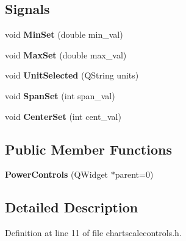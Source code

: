 \subsection*{Signals}
\begin{DoxyCompactItemize}
\item 
void {\bfseries Min\+Set} (double min\+\_\+val)\hypertarget{class_power_controls_ab9a1d9f89f194471d0e31f6dad01086a}{}\label{class_power_controls_ab9a1d9f89f194471d0e31f6dad01086a}

\item 
void {\bfseries Max\+Set} (double max\+\_\+val)\hypertarget{class_power_controls_aef88de9bf3ae6738020c9334ee79e857}{}\label{class_power_controls_aef88de9bf3ae6738020c9334ee79e857}

\item 
void {\bfseries Unit\+Selected} (Q\+String units)\hypertarget{class_power_controls_a6077789456f1780b9f86569256334a38}{}\label{class_power_controls_a6077789456f1780b9f86569256334a38}

\item 
void {\bfseries Span\+Set} (int span\+\_\+val)\hypertarget{class_power_controls_ad146203ff843dd336cca6838be0aa9b4}{}\label{class_power_controls_ad146203ff843dd336cca6838be0aa9b4}

\item 
void {\bfseries Center\+Set} (int cent\+\_\+val)\hypertarget{class_power_controls_a79b389c9c31f94eb5b0ae8fc771b1c7d}{}\label{class_power_controls_a79b389c9c31f94eb5b0ae8fc771b1c7d}

\end{DoxyCompactItemize}
\subsection*{Public Member Functions}
\begin{DoxyCompactItemize}
\item 
{\bfseries Power\+Controls} (Q\+Widget $\ast$parent=0)\hypertarget{class_power_controls_a73bb29ad05d93d0d945596b02b3a058a}{}\label{class_power_controls_a73bb29ad05d93d0d945596b02b3a058a}

\end{DoxyCompactItemize}


\subsection{Detailed Description}


Definition at line 11 of file chartscalecontrols.\+h.

